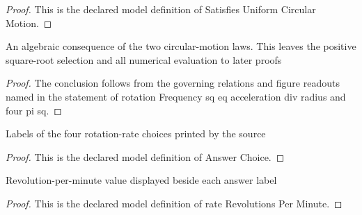 \begin{proof}
  This is the declared model definition of Satisfies Uniform Circular Motion.
\end{proof}
\begin{lemma}
  \label{lem:physics:phyx-mini-0687:phyxminiproblems-problemphyxmini0687-rotationfrequency-sq-eq-acceleration-div-radius-and-four-pi-sq}
  An algebraic consequence of the two circular-motion laws. This leaves the positive square-root selection and all numerical evaluation to later proofs
\end{lemma}
\begin{proof}
  The conclusion follows from the governing relations and figure readouts named in the statement of rotation Frequency sq eq acceleration div radius and four pi sq.
\end{proof}
\begin{definition}
  \label{def:physics:phyx-mini-0687:phyxminiproblems-problemphyxmini0687-answerchoice}
  Labels of the four rotation-rate choices printed by the source
\end{definition}
\begin{proof}
  This is the declared model definition of Answer Choice.
\end{proof}
\begin{definition}
  \label{def:physics:phyx-mini-0687:phyxminiproblems-problemphyxmini0687-answerchoice-raterevolutionsperminute}
  Revolution-per-minute value displayed beside each answer label
\end{definition}
\begin{proof}
  This is the declared model definition of rate Revolutions Per Minute.
\end{proof}
